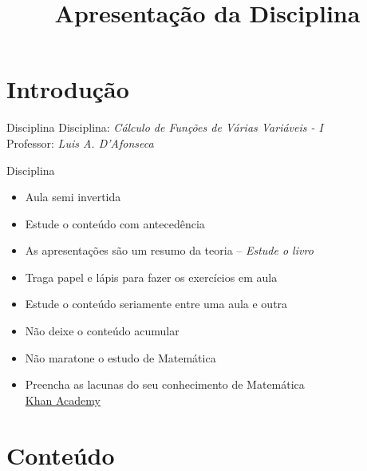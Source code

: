 
\usepackage{calculo_varias_variaveis-1}

\title{Apresentação da Disciplina}



\addtitle

\section{Introdução}

\begin{frame}{Disciplina}
   Disciplina: \emph{\large Cálculo de Funções de Várias Variáveis - I}\\[7mm]
   Professor: \emph{\large Luis A. D'Afonseca}
\end{frame}

\begin{frame}{Disciplina}
\begin{itemize}[<+->]
  \item Aula semi invertida
  \item Estude o conteúdo com antecedência
  \item As apresentações são um resumo da teoria -- \emph{Estude o livro}
  \item Traga papel e lápis para fazer os exercícios em aula
  \item Estude o conteúdo seriamente entre uma aula e outra
  \item Não deixe o conteúdo acumular
  \item Não maratone o estudo de Matemática
  \item Preencha as lacunas do seu conhecimento de Matemática \\
        \href{https://pt.khanacademy.org}{Khan Academy}
\end{itemize}
\end{frame}

\section{Conteúdo}


